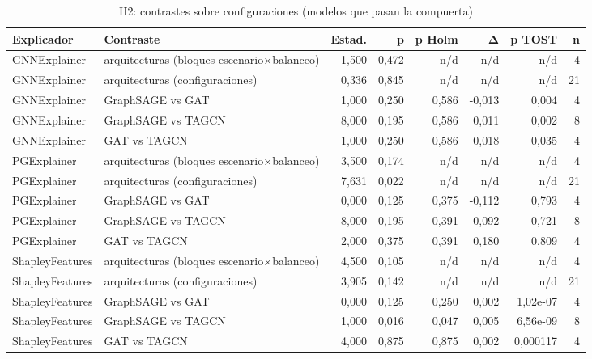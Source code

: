 \begin{table}[htbp]
\centering\small
\caption{H2: contrastes sobre configuraciones (modelos que pasan la compuerta)}
\label{tab:v4-h2}
\begin{tabular}{llrrrrrr}
\toprule
Explicador & Contraste & Estad. & p & p Holm & Δ & p TOST & n \\
\midrule
GNNExplainer & arquitecturas (bloques escenario×balanceo) & 1,500 & 0,472 & n/d & n/d & n/d & 4 \\
GNNExplainer & arquitecturas (configuraciones) & 0,336 & 0,845 & n/d & n/d & n/d & 21 \\
GNNExplainer & GraphSAGE vs GAT & 1,000 & 0,250 & 0,586 & -0,013 & 0,004 & 4 \\
GNNExplainer & GraphSAGE vs TAGCN & 8,000 & 0,195 & 0,586 & 0,011 & 0,002 & 8 \\
GNNExplainer & GAT vs TAGCN & 1,000 & 0,250 & 0,586 & 0,018 & 0,035 & 4 \\
PGExplainer & arquitecturas (bloques escenario×balanceo) & 3,500 & 0,174 & n/d & n/d & n/d & 4 \\
PGExplainer & arquitecturas (configuraciones) & 7,631 & 0,022 & n/d & n/d & n/d & 21 \\
PGExplainer & GraphSAGE vs GAT & 0,000 & 0,125 & 0,375 & -0,112 & 0,793 & 4 \\
PGExplainer & GraphSAGE vs TAGCN & 8,000 & 0,195 & 0,391 & 0,092 & 0,721 & 8 \\
PGExplainer & GAT vs TAGCN & 2,000 & 0,375 & 0,391 & 0,180 & 0,809 & 4 \\
ShapleyFeatures & arquitecturas (bloques escenario×balanceo) & 4,500 & 0,105 & n/d & n/d & n/d & 4 \\
ShapleyFeatures & arquitecturas (configuraciones) & 3,905 & 0,142 & n/d & n/d & n/d & 21 \\
ShapleyFeatures & GraphSAGE vs GAT & 0,000 & 0,125 & 0,250 & 0,002 & 1,02e-07 & 4 \\
ShapleyFeatures & GraphSAGE vs TAGCN & 1,000 & 0,016 & 0,047 & 0,005 & 6,56e-09 & 8 \\
ShapleyFeatures & GAT vs TAGCN & 4,000 & 0,875 & 0,875 & 0,002 & 0,000117 & 4 \\
\bottomrule
\end{tabular}
\end{table}
